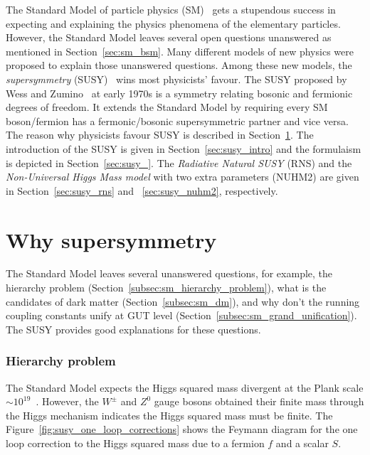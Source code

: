 The Standard Model of particle physics (SM)~\cite{BF02726525,0029-55826190469-2,PhysRevLett.19.1264,Herrero:1998eq,CBO9780511791406} gets a stupendous success in expecting and explaining the physics phenomena of the elementary particles.
However, the Standard Model leaves several open questions unanswered as mentioned in Section~\ref{sec:sm_bsm}.
Many different models of new physics were proposed to explain those unanswered questions.
Among these new models, the \textit{supersymmetry} (SUSY)~\cite{Wess:1974tw,Lykken:1996xt,Drees:1996ca,Martin:1997ns,Bilal:2001nv,Argyres:2001eva,Peskin:2008nw,CBO9780511619250,Shadmi:2017qdk} wins most physicists' favour.
The SUSY proposed by Wess and Zumino~\cite{Wess:1974tw} at early 1970s is a symmetry relating bosonic and fermionic degrees of freedom.
It extends the Standard Model by requiring every SM boson/fermion has a fermonic/bosonic supersymmetric partner and vice versa.
The reason why physicists favour SUSY is described in Section~\ref{sec:susy_why_susy}.  
The introduction of the SUSY is given in Section~\ref{sec:susy_intro} and the formulaism is depicted in Section~\ref{sec:susy_}.
The \textit{Radiative Natural SUSY} (RNS) and the \textit{Non-Universal Higgs Mass model} with two extra parameters (NUHM2) are given in Section~\ref{sec:susy_rns} and ~\ref{sec:susy_nuhm2}, respectively.


\section{Why supersymmetry}
\label{sec:susy_why_susy}
The Standard Model leaves several unanswered questions, for example, the hierarchy problem (Section~\ref{subsec:sm_hierarchy_problem}), what is the candidates of dark matter (Section~\ref{subsec:sm_dm}), and why don't the running coupling constants unify at GUT level (Section~\ref{subsec:sm_grand_unification}).
The SUSY provides good explanations for these questions.


\subsubsection{Hierarchy problem}
\label{subsubsec:susy_hierarchy_problem}
The Standard Model expects the Higgs squared mass divergent at the Plank scale $\sim 10^{19}$~{\GeV}.
However, the $W^{\pm}$ and $Z^{0}$ gauge bosons obtained their finite mass through the Higgs mechanism indicates the Higgs squared mass must be finite.
The Figure~\ref{fig:susy_one_loop_corrections} shows the Feymann diagram for the one loop correction to the Higgs squared mass due to a fermion $f$ and a scalar $S$.

